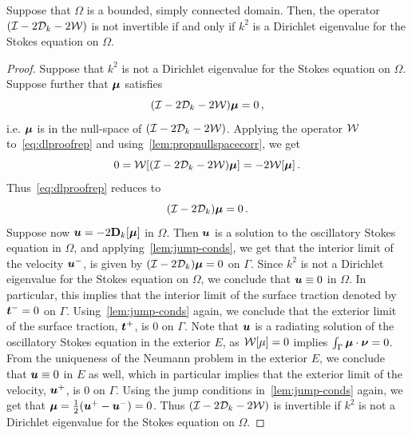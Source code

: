 \begin{thrm}
\label{thm:dlmain}
Suppose that $\Omega$ is a bounded, simply connected domain. Then, the operator
$(\mathcal I - 2{\mathcal D}_{k} - 2 {\mathcal W})$ is not invertible if and only if $k^2$ is a
Dirichlet eigenvalue for the Stokes equation on $\Omega$.
\end{thrm}
\begin{proof}
  Suppose that $k^2$ is not a Dirichlet eigenvalue for
  the Stokes equation on
$\Omega$. 
Suppose further that ${\boldsymbol \mu}$ satisfies
\begin{equation}
(\mathcal I - 2{\mathcal D}_{k} - 2{\mathcal W}) {\boldsymbol \mu} = 0 \, , \label{eq:dlproofrep}
\end{equation}
i.e. ${\boldsymbol \mu}$ is in the null-space
of $(\mathcal I - 2 {\mathcal D}_{k} - 2 {\mathcal W})$. 
Applying the operator ${\mathcal W}$ to~\cref{eq:dlproofrep} and 
using~\cref{lem:propnullspacecorr}, we get
\begin{equation}
0 = {\mathcal W} [(\mathcal I - 2{\mathcal D}_{k} - 2{\mathcal W}){\boldsymbol \mu}] = -2{\mathcal W} [{\boldsymbol \mu}] \, .
\end{equation}
Thus~\cref{eq:dlproofrep} reduces to
\begin{equation}
(\mathcal I - 2 {\mathcal D}_{k}){\boldsymbol \mu} = 0\, .
\end{equation}
Suppose now ${\boldsymbol u} = -2{\bf D}_{k}[{\boldsymbol \mu}]$ in $\Omega$.
Then ${\boldsymbol u}$ is a solution to the oscillatory Stokes equation in $\Omega$,
and applying~\cref{lem:jump-conds}, we get that the interior
limit of the velocity ${\boldsymbol u}^{-}$, is given by $(\mathcal I - 2{\mathcal D}_{k}) {\boldsymbol \mu} = 0$
on $\Gamma$. Since $k^2$ is not a Dirichlet eigenvalue for the Stokes
equation on $\Omega$, we conclude that ${\boldsymbol u} \equiv 0$ in $\Omega$. 
In particular, this implies that the interior limit of the surface traction
denoted by ${\boldsymbol t}^{-} = 0$ on $\Gamma$. 
Using~\cref{lem:jump-conds} again, we conclude that the exterior limit
of the surface traction, ${\boldsymbol t}^{+}$, is $0$ on $\Gamma$. 
Note that ${\boldsymbol u}$ is a radiating solution of the oscillatory
Stokes equation in the exterior $E$, as ${\mathcal W}[\mu] = 0$ implies
$\int_{\Gamma} {\boldsymbol \mu} \cdot {\boldsymbol \nu} = 0$.
From the uniqueness of the Neumann problem in the
exterior $E$, we conclude that ${\boldsymbol u} \equiv 0$ in $E$ as well,
which in particular implies that
the exterior limit of the velocity, ${\boldsymbol u}^{+}$, is $0$ on $\Gamma$.   
Using the jump conditions in~\cref{lem:jump-conds} again, we
get that ${\boldsymbol \mu} = \frac{1}{2}({\boldsymbol u}^{+} - {\boldsymbol u}^{-}) = 0$.
Thus $(\mathcal I - 2{\mathcal D}_{k} - 2{\mathcal W})$ is invertible if $k^2$
is not a Dirichlet eigenvalue for the Stokes equation on $\Omega$.


\end{proof}
